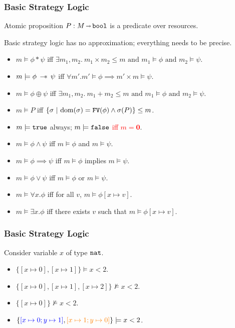 \begin{frame}[fragile]
    \frametitle{Basic Strategy Logic}

\begin{definition} Atomic proposition $P: M \sarr \Bool$ is a predicate over resources.
\end{definition}

\begin{definition} Basic strategy logic has no approximation; everything needs to be precise.
\end{definition}
\begin{itemize}
    \item $m \models\phi * \psi$ iff $\exists m_1, m_2.\ m_1 \times m_2 \leq m \text{ and } m_1 \models\phi \text{ and } m_2 \models\psi$.
    \item $m \models\phi \wand \psi$ iff $\forall m'. m' \models\phi  \implies m' \times m \models\psi$.
    \item $m \models\phi \oplus \psi$ iff $\exists m_1, m_2.\ m_1 + m_2 \leq m \text{ and } m_1 \models\phi \text{ and } m_2 \models\psi$.
    \item $m \models P$ iff $\{\sigma ~|~ \Dom{\sigma} = \Code{FV}(\phi) \land \sigma(P)\}\leq m$.
    \item $m \models\true$ always; $m \models\false$ \textcolor{red}{iff $m = \mathbf{0}$}.
    \item $m \models\phi \land \psi$ iff $m \models\phi$ and $m \models\psi$.
    \item $m \models\phi \implies \psi$ iff $m \models\phi$ implies $m \models\psi$.
    \item $m \models\phi \lor \psi$ iff $m \models\phi$ or $m \models\psi$.
    \item $m \models\forall x. \phi$ iff for all $v$, $m \models\phi[x\mapsto v]$.
    \item $m \models\exists x. \phi$ iff there exists $v$ such that $m \models\phi[x\mapsto v]$.
\end{itemize}

\end{frame}

\begin{frame}[fragile]
    \frametitle{Basic Strategy Logic}

\begin{example} Consider variable $x$ of type $\Nat$.
    \begin{itemize}
        \item $\{[x\mapsto 0], [x\mapsto 1]\} \models x < 2$.
        \item $\{[x\mapsto 0], [x\mapsto 1], [x\mapsto 2]\} \not\models x < 2$.
        \item $\{[x\mapsto 0]\} \not\models x < 2$.
        \item $\{\substxy{blue}{0}{1}, \substxy{orange}{1}{0}\} \models x < 2$.
    \end{itemize}
\end{example}

\end{frame}

